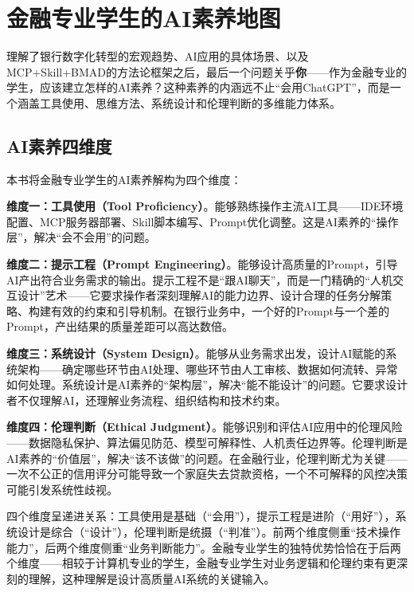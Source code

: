 \section{金融专业学生的AI素养地图}

理解了银行数字化转型的宏观趋势、AI应用的具体场景、以及MCP+Skill+BMAD的方法论框架之后，最后一个问题关乎\textbf{你}——作为金融专业的学生，应该建立怎样的AI素养？这种素养的内涵远不止``会用ChatGPT''，而是一个涵盖工具使用、思维方法、系统设计和伦理判断的多维能力体系。

\subsection{AI素养四维度}

本书将金融专业学生的AI素养解构为四个维度：

\textbf{维度一：工具使用（Tool Proficiency）}。能够熟练操作主流AI工具——IDE环境配置、MCP服务器部署、Skill脚本编写、Prompt优化调整。这是AI素养的``操作层''，解决``会不会用''的问题。

\textbf{维度二：提示工程（Prompt Engineering）}。能够设计高质量的Prompt，引导AI产出符合业务需求的输出。提示工程不是``跟AI聊天''，而是一门精确的``人机交互设计''艺术——它要求操作者深刻理解AI的能力边界、设计合理的任务分解策略、构建有效的约束和引导机制。在银行业务中，一个好的Prompt与一个差的Prompt，产出结果的质量差距可以高达数倍。

\textbf{维度三：系统设计（System Design）}。能够从业务需求出发，设计AI赋能的系统架构——确定哪些环节由AI处理、哪些环节由人工审核、数据如何流转、异常如何处理。系统设计是AI素养的``架构层''，解决``能不能设计''的问题。它要求设计者不仅理解AI，还理解业务流程、组织结构和技术约束。

\textbf{维度四：伦理判断（Ethical Judgment）}。能够识别和评估AI应用中的伦理风险——数据隐私保护、算法偏见防范、模型可解释性、人机责任边界等。伦理判断是AI素养的``价值层''，解决``该不该做''的问题。在金融行业，伦理判断尤为关键——一次不公正的信用评分可能导致一个家庭失去贷款资格，一个不可解释的风控决策可能引发系统性歧视。

\begin{theorybox}[AI素养四维度的递进关系]
四个维度呈递进关系：工具使用是基础（``会用''），提示工程是进阶（``用好''），系统设计是综合（``设计''），伦理判断是统摄（``判准''）。前两个维度侧重``技术操作能力''，后两个维度侧重``业务判断能力''。金融专业学生的独特优势恰恰在于后两个维度——相较于计算机专业的学生，金融专业学生对业务逻辑和伦理约束有更深刻的理解，这种理解是设计高质量AI系统的关键输入。
\end{theorybox}

